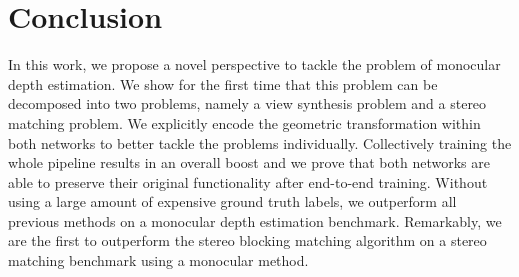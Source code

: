 \documentclass[10pt,twocolumn,letterpaper]{article}
\begin{document}
\section{Conclusion}
In this work, we propose a novel perspective to tackle the problem of monocular depth estimation. We show for the first time that this problem can be decomposed into two problems, namely a view synthesis problem and a stereo matching problem. We explicitly encode the geometric transformation within both networks to better tackle the problems individually. Collectively training the whole pipeline results in an overall boost and we prove that both networks are able to preserve their original functionality after end-to-end training. Without using a large amount of expensive ground truth labels, we outperform all previous methods on a monocular depth estimation benchmark. Remarkably, we are the first to outperform the stereo blocking matching algorithm on a stereo matching benchmark using a monocular method.
            
{\small


}
\end{document}
